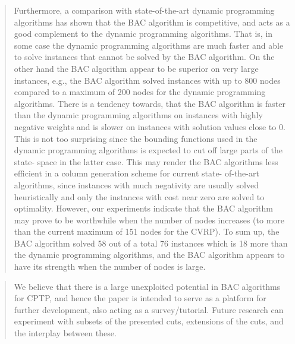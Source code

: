 \begin{quote}
	\cite{jepsen2014}
	Furthermore, a comparison with state-of-the-art dynamic programming algorithms has
	shown that the BAC algorithm is competitive, and acts as a good complement to the dynamic programming algorithms.
	That is, in some case the dynamic programming algorithms are much faster and able to solve instances that cannot be
	solved by the BAC algorithm. On the other hand the BAC algorithm appear to be superior on very large instances, e.g., the
	BAC algorithm solved instances with up to 800 nodes compared to a maximum of 200 nodes for the dynamic programming
	algorithms. There is a tendency towards, that the BAC algorithm is faster than the dynamic programming algorithms on
	instances with highly negative weights and is slower on instances with solution values close to 0. This is not too surprising
	since the bounding functions used in the dynamic programming algorithms is expected to cut off large parts of the state-
	space in the latter case. This may render the BAC algorithms less efficient in a column generation scheme for current state-
	of-the-art algorithms, since instances with much negativity are usually solved heuristically and only the instances with cost
	near zero are solved to optimality. However, our experiments indicate that the BAC algorithm may prove to be worthwhile
	when the number of nodes increases (to more than the current maximum of 151 nodes for the CVRP). To sum up, the BAC
	algorithm solved 58 out of a total 76 instances which is 18 more than the dynamic programming algorithms, and the BAC
	algorithm appears to have its strength when the number of nodes is large.
\end{quote}

\begin{quote}
	\cite{jepsen2014}
	We believe that there is a large unexploited potential in BAC algorithms for CPTP, and hence the paper is intended to
	serve as a platform for further development, also acting as a survey/tutorial. Future research can experiment with subsets
	of the presented cuts, extensions of the cuts, and the interplay between these.
\end{quote}

